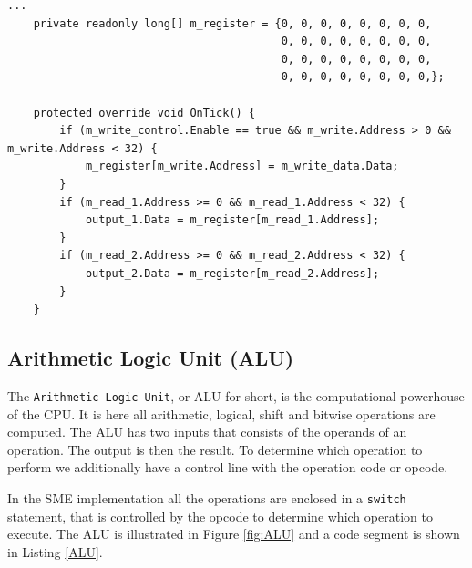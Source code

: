         \begin{minipage}{\linewidth}
            \begin{lstlisting}[language={[Sharp]C}, caption={A slice of the \texttt{register} process SME code. The register is declared as a signed 64-bit array with 32 elements. In every clock cycle the process checks if the write control signal is asserted. If it is we check if the address to be written lies within the register range and is above 0, as this register is reserved to be hard-wired zero. Lastly the process reads the two specified registers and if they lie within the register range, they get outputted to the corresponding buses.},captionpos=b, label = REGISTER]
...
    private readonly long[] m_register = {0, 0, 0, 0, 0, 0, 0, 0,
                                          0, 0, 0, 0, 0, 0, 0, 0,
                                          0, 0, 0, 0, 0, 0, 0, 0,
                                          0, 0, 0, 0, 0, 0, 0, 0,};
            
    protected override void OnTick() {
        if (m_write_control.Enable == true && m_write.Address > 0 && m_write.Address < 32) {
            m_register[m_write.Address] = m_write_data.Data;          
        }
        if (m_read_1.Address >= 0 && m_read_1.Address < 32) { 
            output_1.Data = m_register[m_read_1.Address];
        }
        if (m_read_2.Address >= 0 && m_read_2.Address < 32) { 
            output_2.Data = m_register[m_read_2.Address];
        }
    }
            \end{lstlisting}
        \end{minipage}  
    
    \subsection{Arithmetic Logic Unit (ALU)}
        The \texttt{Arithmetic Logic Unit}, or ALU for short, is the computational powerhouse of the CPU. It is here all arithmetic, logical, shift and bitwise operations are computed.
        The ALU has two inputs that consists of the operands of an operation. The output is then the result. To determine which operation to perform we additionally have a control line with the operation code or opcode.
        
        In the SME implementation all the operations are enclosed in a \texttt{switch} statement, that is controlled by the opcode to determine which operation to execute. The ALU is illustrated in Figure \ref{fig:ALU} and a code segment is shown in Listing \ref{ALU}.
    
